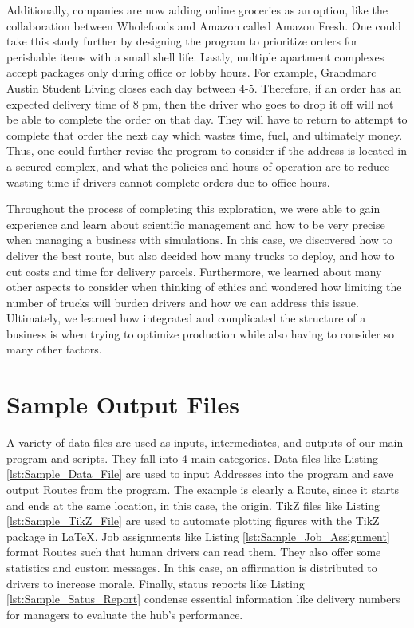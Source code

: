 \documentclass[letterpaper]{article}
\begin{document}
    Additionally, companies are now adding online groceries as an option, like the collaboration between Wholefoods and Amazon called Amazon Fresh. One could take this study further by designing the program to prioritize orders for perishable items with a small shell life. Lastly, multiple apartment complexes accept packages only during office or lobby hours. For example, Grandmarc Austin Student Living closes each day between 4-5. Therefore, if an order has an expected delivery time of 8 pm, then the driver who goes to drop it off will not be able to complete the order on that day. They will have to return to attempt to complete that order the next day which wastes time, fuel, and ultimately money. Thus, one could further revise the program to consider if the address is located in a secured complex, and what the policies and hours of operation are to reduce wasting time if drivers cannot complete orders due to office hours. 

    Throughout the process of completing this exploration, we were able to gain experience and learn about scientific management and how to be very precise when managing a business with simulations. In this case, we discovered how to deliver the best route, but also decided how many trucks to deploy, and how to cut costs and time for delivery parcels. Furthermore, we learned about many other aspects to consider when thinking of ethics and wondered how limiting the number of trucks will burden drivers and how we can address this issue. Ultimately, we learned how integrated and complicated the structure of a business is when trying to optimize production while also having to consider so many other factors. 

    \appendix
    \section{Sample Output Files}
    \label{appendix:Sample_Output_Files}

    A variety of data files are used as inputs, intermediates, and outputs of our main program and scripts. They fall into 4 main categories. Data files like Listing \ref{lst:Sample_Data_File} are used to input Addresses into the program and save output Routes from the program. The example is clearly a Route, since it starts and ends at the same location, in this case, the origin. TikZ files like Listing \ref{lst:Sample_TikZ_File} are used to automate plotting figures with the TikZ package in \LaTeX . Job assignments like Listing \ref{lst:Sample_Job_Assignment} format Routes such that human drivers can read them. They also offer some statistics and custom messages. In this case, an affirmation is distributed to drivers to increase morale. Finally, status reports like Listing \ref{lst:Sample_Satus_Report} condense essential information like delivery numbers for managers to evaluate the hub's performance.
\end{document}
